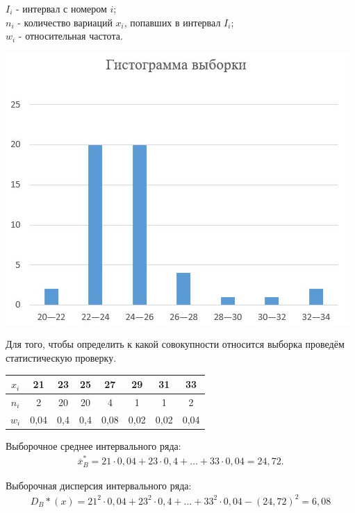 \documentclass[utf8, a4paper, 14pt, russian, oneside]{book}
\begin{document}
$I_i$ - интервал с номером $i$;\\
$n_i$ - количество вариаций $x_i$, попавших в интервал $I_i$;\\
$w_i$ - относительная частота.

\begin{center}
\includegraphics[scale=0.95]{img/gisto_choice.jpg}
\end{center}

Для того, чтобы определить к какой совокупности относится выборка проведём статистическую проверку.
\newpage

\begin{table}[h!]
    \centering
    \begin{tabular}{|c|c|c|c|c|c|c|c|}
        \hline
        $x_i$ & 21 & 23 & 25 & 27 & 29 & 31 & 33\\
        \hline
        $n_i$ & 2 & 20 & 20 & 4 & 1 & 1 & 2 \\
        \hline
        $w_i$ & 0,04 & 0,4 & 0,4 & 0,08 & 0,02 & 0,02 & 0,04 \\
        \hline
    \end{tabular}
\end{table}

Выборочное среднее интервального ряда:
\begin{align*}
    \overline{x}_B^* = 21 \cdot 0,04 + 23 \cdot 0,4 + \ldots + 33 \cdot 0,04 = 24,72.
\end{align*}

Выборочная дисперсия интервального ряда:
\begin{align*}
    D_B*(x) = 21^2 \cdot 0,04 + 23^2 \cdot 0,4 + \ldots + 33^2 \cdot 0,04 - (24,72)^2 = 6,08
\end{align*}
\end{document}
